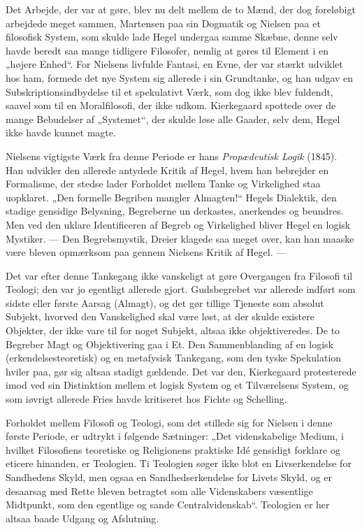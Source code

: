 \documentclass[12pt,a4paper,openany]{book}
\newcommand{\opage}[1]{\marginnote{\footnotesize\textit{[#1]}}}
\begin{document}
Det Arbejde, der var at gøre, blev nu delt mellem de to Mænd, der dog
foreløbigt arbejdede meget sammen, Martensen paa sin Dogmatik og Nielsen paa et
filosofisk System, som skulde lade Hegel undergaa samme Skæbne, denne selv
havde beredt saa mange tidligere Filosofer, nemlig at gøres til Element i en
„højere Enhed“. For Nielsens livfulde Fantasi, en Evne, der var stærkt udviklet
hos ham, formede det nye System sig allerede i sin Grundtanke, og han udgav en
Subskriptionsindbydelse til et spekulativt Værk, som dog ikke blev fuldendt,
saavel som til en Moralfilosofi, der ikke udkom. Kierkegaard spottede over de
mange Bebudelser af „Systemet“, der skulde løse alle Gaader, selv dem, Hegel
ikke havde kunnet magte.

Nielsens vigtigste Værk fra denne Periode er hans \textit{Propædeutisk Logik}
(1845). Han udvikler den allerede antydede Kritik af Hegel, hvem han bebrejder
en Formalisme, der stedse lader Forholdet mellem Tanke og Virkelighed staa
uopklaret. „Den formelle Begriben mangler Almagten!“ Hegels Dialektik, den
stadige gensidige Belysning, Begreberne un%
\setcounter{footnote}{0}%
\opage{186}derkastes, anerkendes og beundres. Men ved den uklare Identificeren
af Begreb og Virkelighed bliver Hegel en logisk Mystiker. --- Den
Begrebsmystik, Dreier klagede saa meget over, kan han maaske være bleven
opmærksom paa gennem Nielsens Kritik af Hegel. ---

Det var efter denne Tankegang ikke vanskeligt at gøre Overgangen fra Filosofi
til Teologi; den var jo egentligt allerede gjort. Gudsbegrebet var allerede
indført som sidste eller første Aarsag (Almagt), og det gør tillige Tjeneste
som absolut Subjekt, hvorved den Vanskelighed skal være løst, at der skulde
existere Objekter, der ikke vare til for noget Subjekt, altsaa ikke
objektiveredes. De to Begreber Magt og Objektivering gaa i Et. Den
Sammenblanding af en logisk (erkendelsesteoretisk) og en metafysisk Tankegang,
som den tyske Spekulation hviler paa, gør sig altsaa stadigt gældende. Det var
den, Kierkegaard protesterede imod ved sin Distinktion mellem et logisk System
og et Tilværelsens System, og som iøvrigt allerede Fries havde kritiseret hos
Fichte og Schelling.

Forholdet mellem Filosofi og Teologi, som det stillede sig for Nielsen i denne
første Periode, er udtrykt i følgende Sætninger: „Det videnskabelige Medium, i
hvilket Filosofiens teoretiske og Religionens praktiske Idé gensidigt forklare
og eticere hinanden, er Teologien. Ti Teologien søger ikke blot en
Livserkendelse for Sandhedens Skyld, men ogsaa en Sandhedserkendelse for Livets
Skyld, og er desaarsag med Rette bleven betragtet som alle Videnskabers
væsentlige Midtpunkt, som den egentlige og sande Centralvidenskab“. Teologien
er her altsaa baade Udgang og Afslutning.
\end{document}
